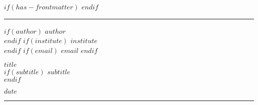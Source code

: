 
$if(has-frontmatter)$
\frontmatter
$endif$
\fancyhead[C]{}
\hrule \medskip %
\begin{minipage}{0.295\textwidth} 
\raggedright
\footnotesize
$if(author)$
$author$ \hfill\\
$endif$
$if(institute)$
$institute$ \hfill\\
$endif$
$if(email)$
$email$
$endif$
\end{minipage}
\begin{minipage}{0.4\textwidth} 
\centering 
\large 
$title$\\ 
\normalsize 
$if(subtitle)$
$subtitle$\\ 
$endif$
\end{minipage}
\begin{minipage}{0.295\textwidth} 
\raggedleft
$date$\hfill\\
\end{minipage}
\medskip\hrule 
\bigskip